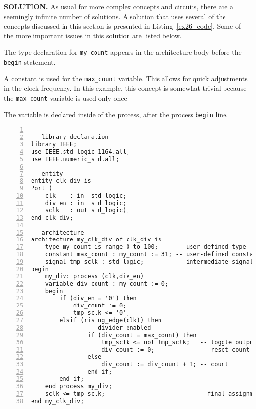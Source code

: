\noindent
\textbf{SOLUTION.} As usual for more complex concepts and circuits, there are a seemingly infinite number of solutions. A solution that uses several of the concepts discussed in this section is presented in Listing~\ref{ex26_code}. Some of the more important issues in this solution are listed below.

\begin{my_list}
\item The type declaration for  \texttt{my\_count} appears in the architecture body before the \texttt{begin} statement.

\item A constant is used for the  \texttt{max\_count} variable. This allows for quick adjustments in the clock frequency. In this example, this concept is somewhat trivial because the  \texttt{max\_count} variable is used only once.

\item The variable is declared inside of the process, after the process \texttt{begin} line.
\end{my_list}

\noindent
\begin{minipage}{0.99\linewidth}
\begin{lstlisting}[numbers=left,label=ex26_code, caption=Solution to Example~26.]

-- library declaration
library IEEE;
use IEEE.std_logic_1164.all;
use IEEE.numeric_std.all;

-- entity
entity clk_div is
Port (
    clk    : in  std_logic;
    div_en : in  std_logic;
    sclk   : out std_logic);
end clk_div;

-- architecture
architecture my_clk_div of clk_div is
    type my_count is range 0 to 100;     -- user-defined type
    constant max_count : my_count := 31; -- user-defined constant
    signal tmp_sclk : std_logic;         -- intermediate signal
begin
    my_div: process (clk,div_en)
    variable div_count : my_count := 0;
    begin
        if (div_en = '0') then
            div_count := 0;
            tmp_sclk <= '0';
        elsif (rising_edge(clk)) then
                -- divider enabled
                if (div_count = max_count) then
                    tmp_sclk <= not tmp_sclk;   -- toggle output
                    div_count := 0;             -- reset count
                else
                    div_count := div_count + 1; -- count
                end if;
        end if;
    end process my_div;
    sclk <= tmp_sclk;                          -- final assignment
end my_clk_div;
\end{lstlisting}
\end{minipage}

